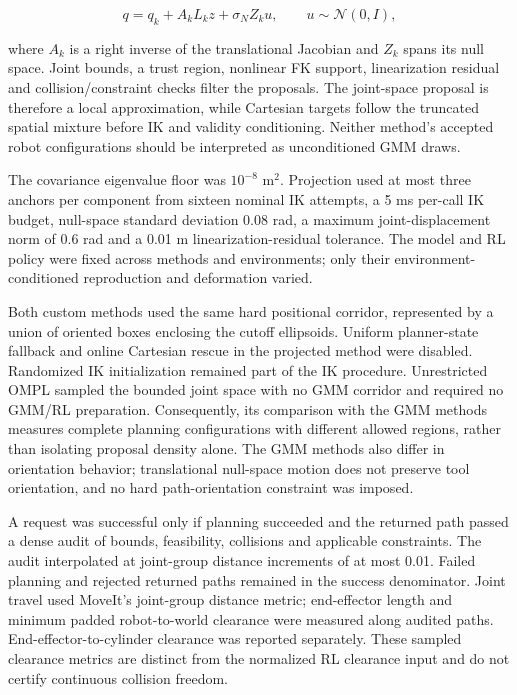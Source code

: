 \[q = q_k + A_kL_kz + \sigma_N Z_k u,\qquad u\sim\mathcal{N}(0,I),\]

where \(A_k\) is a right inverse of the translational Jacobian and \(Z_k\) spans its null space. Joint bounds, a trust region, nonlinear FK support, linearization residual and collision/constraint checks filter the proposals. The joint-space proposal is therefore a local approximation, while Cartesian targets follow the truncated spatial mixture before IK and validity conditioning. Neither method's accepted robot configurations should be interpreted as unconditioned GMM draws.

The covariance eigenvalue floor was \(10^{-8}\) m\(^2\). Projection used at most three anchors per component from sixteen nominal IK attempts, a 5 ms per-call IK budget, null-space standard deviation 0.08 rad, a maximum joint-displacement norm of 0.6 rad and a 0.01 m linearization-residual tolerance. The model and RL policy were fixed across methods and environments; only their environment-conditioned reproduction and deformation varied.

Both custom methods used the same hard positional corridor, represented by a union of oriented boxes enclosing the cutoff ellipsoids. Uniform planner-state fallback and online Cartesian rescue in the projected method were disabled. Randomized IK initialization remained part of the IK procedure. Unrestricted OMPL sampled the bounded joint space with no GMM corridor and required no GMM/RL preparation. Consequently, its comparison with the GMM methods measures complete planning configurations with different allowed regions, rather than isolating proposal density alone. The GMM methods also differ in orientation behavior; translational null-space motion does not preserve tool orientation, and no hard path-orientation constraint was imposed.

A request was successful only if planning succeeded and the returned path passed a dense audit of bounds, feasibility, collisions and applicable constraints. The audit interpolated at joint-group distance increments of at most 0.01. Failed planning and rejected returned paths remained in the success denominator. Joint travel used MoveIt's joint-group distance metric; end-effector length and minimum padded robot-to-world clearance were measured along audited paths. End-effector-to-cylinder clearance was reported separately. These sampled clearance metrics are distinct from the normalized RL clearance input and do not certify continuous collision freedom.

